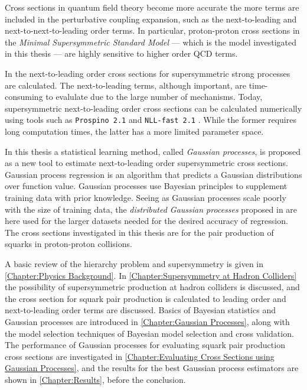 \documentclass[twoside,english]{uiofysmaster}
\begin{document}
Cross sections in quantum field theory become more accurate the more terms are included in the perturbative coupling expansion, such as the next-to-leading and next-to-next-to-leading order terms. In particular, proton-proton cross sections in the \textit{Minimal Supersymmetric Standard Model} --- which is the model investigated in this thesis --- are highly sensitive to higher order QCD terms.

In \cite{beenakker1997squark} the next-to-leading order cross sections for supersymmetric strong processes are calculated. The next-to-leading terms, although important, are time-consuming to evalulate due to the large number of mechanisms. Today, supersymmetric next-to-leading order cross sections can be calculated numerically using tools such as \verb|Prospino 2.1| \cite{beenakker1996prospino} and \verb|NLL-fast 2.1| \cite{beenakker2016nlo+}. While the former requires long computation times, the latter has a more limited parameter space. 

In this thesis a statistical learning method, called \textit{Gaussian processes}, is proposed as a new tool to estimate next-to-leading order supersymmetric cross sections. Gaussian process regression is an algorithm that predicts a Gaussian distributions over function value. Gaussian processes use Bayesian principles to supplement training data with prior knowledge. Seeing as Gaussian processes scale poorly with the size of training data, the \textit{distributed Gaussian processes} proposed in \cite{deisenroth2015distributed} are here used for the larger datasets needed for the desired accuracy of regression. The cross sections investigated in this thesis are for the pair production of squarks in proton-proton collisions.

A basic review of the hierarchy problem and supersymmetry is given in \autoref{Chapter:Physics Background}. In \autoref{Chapter:Supersymmetry at Hadron Colliders} the possibility of supersymmetric production at hadron colliders is discussed, and the cross section for squark pair production is calculated to leading order and next-to-leading order terms are discussed. Basics of Bayesian statistics and Gaussian processes are introduced in \autoref{Chapter:Gaussian Processes}, along with the model selection techniques of Bayesian model selection and cross validation. The performance of Gaussian processes for evaluating squark pair production cross sections are investigated in \autoref{Chapter:Evaluating Cross Sections using Gaussian Processes}, and the results for the best Gaussian process estimators are shown in \autoref{Chapter:Results}, before the conclusion.
\end{document}
